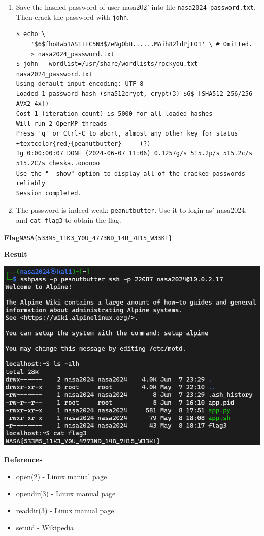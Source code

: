 \documentclass[12pt, a4paper]{article}
\begin{document}
\begin{enumerate}[label=(\alph*)]
\begin{enumerate}[label=(\arabic*)]
      \item Save the hashed password of user nasa202ˋ into file \verb|nasa2024_password.txt|.
      Then crack the password with \verb|john|.
      \begin{Verbatim}[frame=single, fontsize=\scriptsize, commandchars=+\{\}]
$ echo \
    '$6$fho8wb1AS1tFC5N3$/eNgObH......MAih82ldPjFO1' \ # Omitted.
    > nasa2024_password.txt
$ john --wordlist=/usr/share/wordlists/rockyou.txt nasa2024_password.txt
Using default input encoding: UTF-8
Loaded 1 password hash (sha512crypt, crypt(3) $6$ [SHA512 256/256 AVX2 4x])
Cost 1 (iteration count) is 5000 for all loaded hashes
Will run 2 OpenMP threads
Press 'q' or Ctrl-C to abort, almost any other key for status
+textcolor{red}{peanutbutter}     (?)
1g 0:00:00:07 DONE (2024-06-07 11:06) 0.1257g/s 515.2p/s 515.2c/s 515.2C/s cheska..oooooo
Use the "--show" option to display all of the cracked passwords reliably
Session completed.
      \end{Verbatim}

      \item The password is indeed weak: \verb|peanutbutter|. Use it to login asˋ
      nasa2024, and \verb|cat flag3| to obtain the flag.
    \end{enumerate}

    \pagebreak
    \textbf{Flag}\quad\verb|NASA{533M5_11K3_Y0U_4773ND_14B_7H15_W33K!}|

    \textbf{Result}

    \includegraphics[width=\linewidth]{1-c_result.png}

    \textbf{References}
    \begin{itemize}
      \item \href{https://man7.org/linux/man-pages/man2/open.2.html}{open(2) - Linux manual page}
      \item \href{https://man7.org/linux/man-pages/man3/opendir.3.html}{opendir(3) - Linux manual page}
      \item \href{https://man7.org/linux/man-pages/man3/readdir.3.html}{readdir(3) - Linux manual page}
      \item \href{https://en.wikipedia.org/wiki/Setuid}{setuid - Wikipedia}
    \end{itemize}


\end{enumerate}
\end{document}
